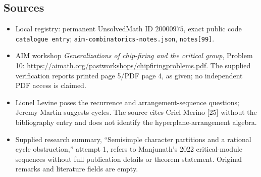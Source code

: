 \documentclass[11pt]{article}
\begin{document}
\subsection{Sources}
\begin{itemize}
\item Local registry: permanent UnsolvedMath ID \(20000975\), exact public code \texttt{catalogue entry}; \texttt{aim-combinatorics-notes.json}, \texttt{notes[99]}.
\item AIM workshop \emph{Generalizations of chip-firing and the critical group}, Problem 10: \url{https://aimath.org/pastworkshops/chipfiringproblems.pdf}. The supplied verification reports printed page 5/PDF page 4, as given; no independent PDF access is claimed.
\item Lionel Levine poses the recurrence and arrangement-sequence questions; Jeremy Martin suggests cycles. The source cites Criel Merino [25] without the bibliography entry and does not identify the hyperplane-arrangement algebra.
\item Supplied research summary, ``Semisimple character partitions and a rational cycle obstruction,'' attempt 1, refers to Manjunath's 2022 critical-module sequences without full publication details or theorem statement. Original remarks and literature fields are empty.
\end{itemize}
\end{document}
